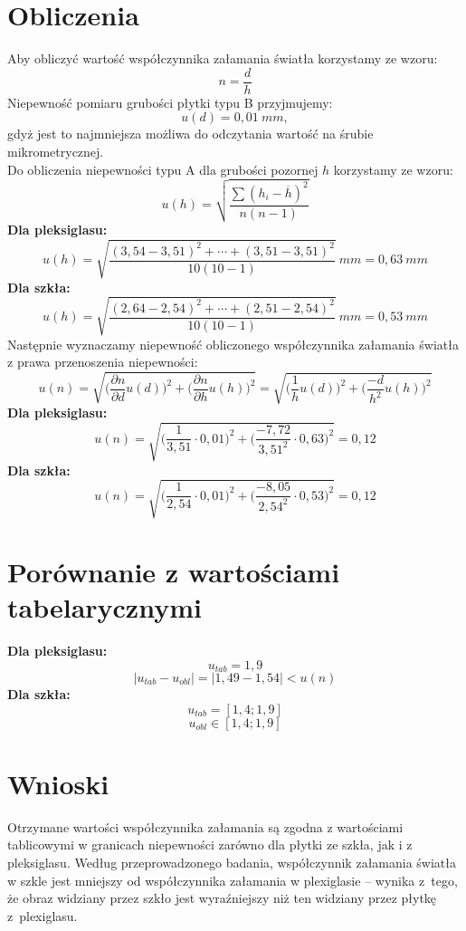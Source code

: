 \documentclass[a4paper,11pt]{article}
\begin{document}
\section{Obliczenia}
Aby obliczyć wartość współczynnika załamania światła korzystamy ze wzoru:
$$n=\frac{d}{h}$$
Niepewność pomiaru grubości płytki typu B przyjmujemy:
$$u(d)=0,01~mm,$$
gdyż jest to najmniejsza możliwa do odczytania wartość na śrubie mikrometrycznej.\\
Do obliczenia niepewności typu A dla grubości pozornej $h$ korzystamy ze wzoru:
$$u(h) = \sqrt{\frac{\sum(h_{i}-\overline{h})^{2}}{n(n-1)}}$$
\textbf{Dla pleksiglasu:}
$$u(h)=\displaystyle \sqrt{\frac{(3,54-3,51)^{2}+\cdots +(3,51-3,51)^{2}}{10(10-1)}}~mm= 0,63~mm$$
\textbf{Dla szkła:}
$$u(h)=\displaystyle \sqrt{\frac{(2,64-2,54)^{2}+\cdots +(2,51-2,54)^{2}}{10(10-1)}}~mm= 0,53~mm$$	
Następnie wyznaczamy niepewność obliczonego współczynnika załamania światła z prawa przenoszenia niepewności:
$$ u(n) =\sqrt{\bigg(\frac{\partial n}{\partial d}u(d)\bigg)^2+\bigg(\frac{\partial n}{\partial h}u(h)\bigg)^2} = \sqrt{\bigg(\frac{1}{h}u(d)\bigg)^2+\bigg(\frac{-d}{h^2}u(h)\bigg)^2}$$
\textbf{Dla pleksiglasu:}
$$ u(n) = \sqrt{\bigg(\frac{1}{3,51}\cdot 0,01\bigg)^2+\bigg(\frac{-7,72} {3,51^2}\cdot 0,63\bigg)^2} = 0,12$$
\textbf{Dla szkła:}
$$ u(n) = \sqrt{\bigg(\frac{1}{2,54}\cdot 0,01\bigg)^2+\bigg(\frac{-8,05} {2,54^2}\cdot 0,53\bigg)^2} = 0,12$$
\section{Porównanie z wartościami tabelarycznymi}
\textbf{Dla pleksiglasu:}
$$u_{tab} = 1,9$$
$$|u_{tab}-u_{obl}|=|1,49-1,54|<u(n)$$ 
\textbf{Dla szkła:}
$$u_{tab} = [1,4;1,9]$$
$$u_{obl} \in [1,4;1,9]$$
\section{Wnioski}
Otrzymane wartości współczynnika załamania są zgodna z wartościami tablicowymi w granicach niepewności zarówno dla płytki ze szkła, jak i z pleksiglasu.
Według przeprowadzonego badania, współczynnik załamania światła w szkle jest mniejszy od współczynnika załamania w plexiglasie -- wynika z~tego, że obraz widziany przez szkło jest wyraźniejszy niż ten widziany przez płytkę z~plexiglasu.  
\end{document}
